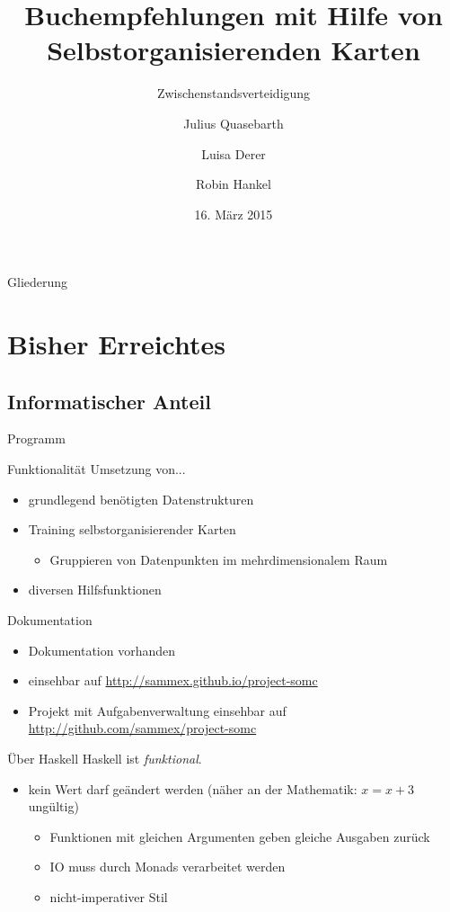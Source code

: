 \documentclass{beamer}
\title{Buchempfehlungen mit Hilfe von Selbstorganisierenden Karten}
\subtitle{Zwischenstandsverteidigung}
\author{Julius Quasebarth \and Luisa Derer \and Robin Hankel}
\institute{Albert Schweitzer Gymnasium Erfurt, Spez.}
\date{16. März 2015}
\begin{document}
\maketitle

\begin{frame}{Gliederung}
\tableofcontents
\end{frame}

\section{Bisher Erreichtes}

\subsection{Informatischer Anteil}

\begin{frame}{Programm}
\begin{block}{Funktionalität}
Umsetzung von...
\pause
\begin{itemize}[<+->]
\item grundlegend benötigten Datenstrukturen
\item Training selbstorganisierender Karten
	\begin{itemize}[<+->]
	\item Gruppieren von Datenpunkten im mehrdimensionalem Raum
	\end{itemize}
\item diversen Hilfsfunktionen
\end{itemize}
\end{block}
\pause
\begin{block}{Dokumentation}
\begin{itemize}[<+->]
\item Dokumentation vorhanden
\item einsehbar auf \url{http://sammex.github.io/project-somc}
\item Projekt mit Aufgabenverwaltung einsehbar auf \url{http://github.com/sammex/project-somc}
\end{itemize}
\end{block}
\end{frame}

\begin{frame}{Über Haskell}
Haskell ist \emph{funktional}.
\begin{itemize}[<+->]
\item kein Wert darf geändert werden (näher an der Mathematik: \(x = x +  3\) ungültig)
	\begin{itemize}[<+->]
	\item Funktionen mit gleichen Argumenten geben gleiche Ausgaben zurück
	\item IO muss durch \glqq{}Monads\grqq{} verarbeitet werden
	\item nicht-imperativer Stil
	\end{itemize}
\end{itemize}
\end{frame}
\end{document}
